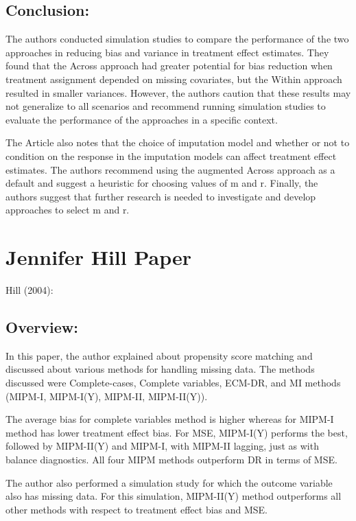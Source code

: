 \documentclass{article}
\begin{document}
\hypertarget{conclusion}{%
\subsection{Conclusion:}\label{conclusion}}

The authors conducted simulation studies to compare the performance of
the two approaches in reducing bias and variance in treatment effect
estimates. They found that the Across approach had greater potential for
bias reduction when treatment assignment depended on missing covariates,
but the Within approach resulted in smaller variances. However, the
authors caution that these results may not generalize to all scenarios
and recommend running simulation studies to evaluate the performance of
the approaches in a specific context.

The Article also notes that the choice of imputation model and whether
or not to condition on the response in the imputation models can affect
treatment effect estimates. The authors recommend using the augmented
Across approach as a default and suggest a heuristic for choosing values
of m and r. Finally, the authors suggest that further research is needed
to investigate and develop approaches to select m and r.

\hypertarget{jennifer-hill-paper}{%
\section{Jennifer Hill Paper}\label{jennifer-hill-paper}}

Hill (2004):

\hypertarget{overview}{%
\subsection{Overview:}\label{overview}}

In this paper, the author explained about propensity score matching and
discussed about various methods for handling missing data. The methods
discussed were Complete-cases, Complete variables, ECM-DR, and MI
methods (MIPM-I, MIPM-I(Y), MIPM-II, MIPM-II(Y)).

The average bias for complete variables method is higher whereas for
MIPM-I method has lower treatment effect bias. For MSE, MIPM-I(Y)
performs the best, followed by MIPM-II(Y) and MIPM-I, with MIPM-II
lagging, just as with balance diagnostics. All four MIPM methods
outperform DR in terms of MSE.

The author also performed a simulation study for which the outcome
variable also has missing data. For this simulation, MIPM-II(Y) method
outperforms all other methods with respect to treatment effect bias and
MSE.
\end{document}
